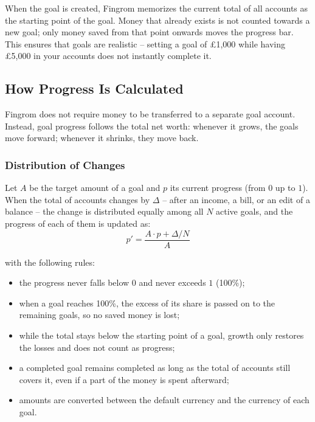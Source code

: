 \noindent When the goal is created, Fingrom memorizes the current total of all accounts as
the starting point of the goal. Money that already exists is not counted towards a new goal;
only money saved from that point onwards moves the progress bar. This ensures that goals are
realistic -- setting a goal of £1,000 while having £5,000 in your accounts does not instantly
complete it.


\subsection{How Progress Is Calculated}
\label{goal:progress}

Fingrom does not require money to be transferred to a separate goal account. Instead, goal
progress follows the total net worth: whenever it grows, the goals move forward; whenever it
shrinks, they move back.

\subsubsection{Distribution of Changes}

Let $A$ be the target amount of a goal and $p$ its current progress (from $0$ up to $1$).
When the total of accounts changes by $\Delta$ -- after an income, a bill, or an edit of a
balance -- the change is distributed equally among all $N$ active goals, and the progress of
each of them is updated as:
\[
  p' = \frac{A \cdot p + \Delta / N}{A}
\]

\noindent with the following rules:

\begin{itemize}
  \item the progress never falls below $0$ and never exceeds $1$ (100\%);
  \item when a goal reaches 100\%, the excess of its share is passed on to the remaining
  goals, so no saved money is lost;
  \item while the total stays below the starting point of a goal, growth only restores the
  losses and does not count as progress;
  \item a completed goal remains completed as long as the total of accounts still covers it,
  even if a part of the money is spent afterward;
  \item amounts are converted between the default currency and the currency of each goal.
\end{itemize}

